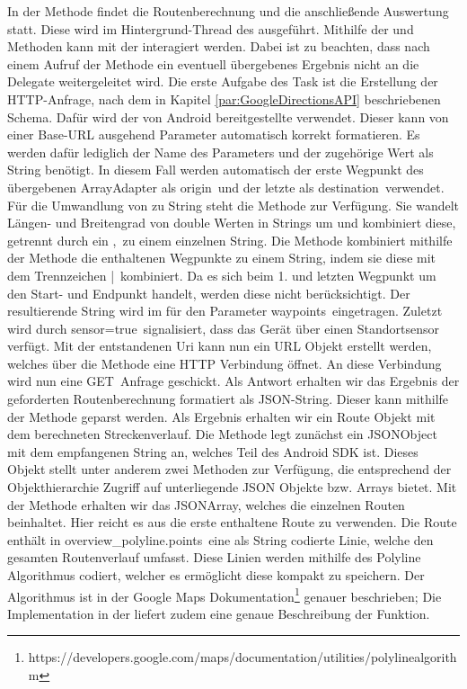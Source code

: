 In der  Methode findet die Routenberechnung und die anschließende Auswertung statt. Diese wird im Hintergrund-Thread des  ausgeführt. Mithilfe der  und  Methoden kann mit der  interagiert werden. Dabei ist zu beachten, dass nach einem Aufruf der  Methode ein eventuell übergebenes Ergebnis nicht an die Delegate weitergeleitet wird. Die erste Aufgabe des Task ist die Erstellung der HTTP-Anfrage, nach dem in Kapitel \ref{par:GoogleDirectionsAPI} beschriebenen Schema. Dafür wird der von Android bereitgestellte  verwendet. Dieser kann von einer Base-URL ausgehend Parameter automatisch korrekt formatieren. Es werden dafür lediglich der Name des Parameters und der zugehörige Wert als String benötigt. In diesem Fall werden automatisch der erste Wegpunkt des übergebenen ArrayAdapter als \glqq origin\grqq\ und der letzte als \glqq destination\grqq\ verwendet. Für die Umwandlung von  zu String steht die  Methode zur Verfügung. Sie wandelt Längen- und Breitengrad von double Werten in Strings um und kombiniert diese, getrennt durch ein \glqq,\grqq\ zu einem einzelnen String. Die  Methode kombiniert mithilfe der  Methode die enthaltenen Wegpunkte zu einem String, indem sie diese mit dem Trennzeichen \glqq|\grqq\ kombiniert. Da es sich beim 1. und letzten Wegpunkt um den Start- und Endpunkt handelt, werden diese nicht berücksichtigt. Der resultierende String wird im  für den Parameter \glqq waypoints\grqq\ eingetragen. Zuletzt wird durch \glqq sensor=true\grqq\ signalisiert, dass das Gerät über einen Standortsensor verfügt. Mit der entstandenen Uri kann nun ein URL Objekt erstellt werden, welches über die  Methode eine HTTP Verbindung öffnet. An diese Verbindung wird nun eine \glqq GET\grqq\ Anfrage geschickt. Als Antwort erhalten wir das Ergebnis der geforderten Routenberechnung formatiert als JSON-String. Dieser kann mithilfe der  Methode geparst werden. Als Ergebnis erhalten wir ein Route Objekt mit dem berechneten Streckenverlauf. Die Methode legt zunächst ein JSONObject mit dem empfangenen String an, welches Teil des Android SDK ist. Dieses Objekt stellt unter anderem zwei Methoden zur Verfügung, die entsprechend der Objekthierarchie Zugriff auf unterliegende JSON Objekte bzw. Arrays bietet. Mit der  Methode erhalten wir das JSONArray, welches die einzelnen Routen beinhaltet. Hier reicht es aus die erste enthaltene Route zu verwenden. Die Route enthält in \glqq overview\_polyline.points\grqq\ eine als String codierte Linie, welche den gesamten Routenverlauf umfasst. Diese Linien werden mithilfe des Polyline Algorithmus codiert, welcher es ermöglicht diese kompakt zu speichern. Der Algorithmus ist in der Google Maps Dokumentation\footnote{https://developers.google.com/maps/documentation/utilities/polylinealgorithm} genauer beschrieben; Die Implementation in der  liefert zudem eine genaue Beschreibung der Funktion. 